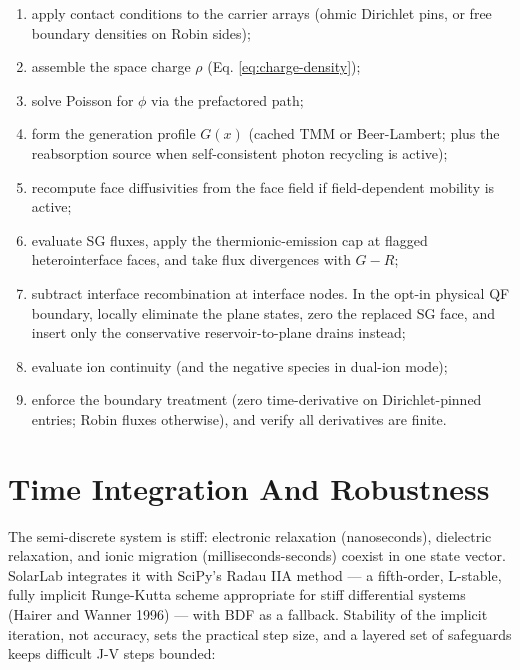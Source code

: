 \documentclass[
  11pt,
  american,
]{report}
\providecommand{\tightlist}{%
  \setlength{\itemsep}{0pt}\setlength{\parskip}{0pt}}
\begin{document}
\begin{enumerate}
\def\labelenumi{\arabic{enumi}.}
\tightlist
\item
  apply contact conditions to the carrier arrays (ohmic Dirichlet pins,
  or free boundary densities on Robin sides);
\item
  assemble the space charge \(\rho\) (Eq. \ref{eq:charge-density});
\item
  solve Poisson for \(\phi\) via the prefactored path;
\item
  form the generation profile \(G(x)\) (cached TMM or Beer-Lambert; plus
  the reabsorption source when self-consistent photon recycling is
  active);
\item
  recompute face diffusivities from the face field if field-dependent
  mobility is active;
\item
  evaluate SG fluxes, apply the thermionic-emission cap at flagged
  heterointerface faces, and take flux divergences with \(G-R\);
\item
  subtract interface recombination at interface nodes. In the opt-in
  physical QF boundary, locally eliminate the plane states, zero the
  replaced SG face, and insert only the conservative reservoir-to-plane
  drains instead;
\item
  evaluate ion continuity (and the negative species in dual-ion mode);
\item
  enforce the boundary treatment (zero time-derivative on
  Dirichlet-pinned entries; Robin fluxes otherwise), and verify all
  derivatives are finite.
\end{enumerate}

\hypertarget{time-integration-and-robustness}{%
\section{Time Integration And
Robustness}\label{time-integration-and-robustness}}

The semi-discrete system is stiff: electronic relaxation (nanoseconds),
dielectric relaxation, and ionic migration (milliseconds-seconds)
coexist in one state vector. SolarLab integrates it with SciPy's Radau
IIA method --- a fifth-order, L-stable, fully implicit Runge-Kutta
scheme appropriate for stiff differential systems (Hairer and Wanner
1996) --- with BDF as a fallback. Stability of the implicit iteration,
not accuracy, sets the practical step size, and a layered set of
safeguards keeps difficult J-V steps bounded:
\end{document}
